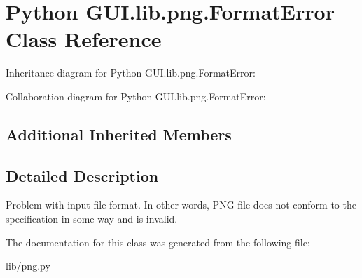 \hypertarget{class_python_01_g_u_i_1_1lib_1_1png_1_1_format_error}{}\section{Python G\+U\+I.\+lib.\+png.\+Format\+Error Class Reference}
\label{class_python_01_g_u_i_1_1lib_1_1png_1_1_format_error}


Inheritance diagram for Python G\+U\+I.\+lib.\+png.\+Format\+Error\+:


Collaboration diagram for Python G\+U\+I.\+lib.\+png.\+Format\+Error\+:
\subsection*{Additional Inherited Members}


\subsection{Detailed Description}
\begin{DoxyVerb}Problem with input file format.  In other words, PNG file does
not conform to the specification in some way and is invalid.
\end{DoxyVerb}
 

The documentation for this class was generated from the following file\+:\begin{DoxyCompactItemize}
\item 
lib/png.\+py\end{DoxyCompactItemize}
